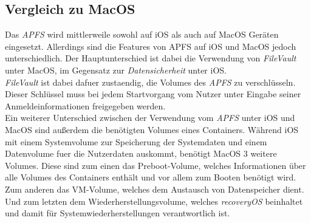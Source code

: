 \subsection{Vergleich zu MacOS}
Das \textit{APFS} wird mittlerweile sowohl auf iOS als auch auf MacOS Geräten eingesetzt. Allerdings sind die Features von APFS auf iOS und MacOS jedoch unterschiedlich. Der Hauptunterschied ist dabei die Verwendung von \textit{FileVault} unter MacOS\cite[S. 56 ff]{Apple2020}, im Gegensatz zur \textit{Datensicherheit} unter iOS\cite[S. 48 ff]{Apple2020}.\\
\textit{FileVault} ist dabei dafuer zustaendig, die Volumes des \textit{APFS} zu verschlüsseln. Dieser Schlüssel muss bei jedem Startvorgang vom Nutzer unter Eingabe seiner Anmeldeinformationen freigegeben werden.\\
Ein weiterer Unterschied zwischen der Verwendung vom \textit{APFS} unter iOS und MacOS sind außerdem die benötigten Volumes eines Containers.
Während iOS mit einem Systemvolume zur Speicherung der Systemdaten und einem Datenvolume fuer die Nutzerdaten auskommt\cite[S. 49]{Apple2020}, benötigt MacOS 3 weitere Volumes\cite[S. 48]{Apple2020}. Diese sind zum einen das Preboot-Volume, welches Informationen über alle Volumes des Containers enthält und vor allem zum Booten benötigt wird. Zum anderen das VM-Volume, welches dem Austausch von Datenspeicher dient. Und zum letzten dem Wiederherstellungsvolume, welches \textit{recoveryOS} beinhaltet und damit für Systemwiederherstellungen verantwortlich ist.
